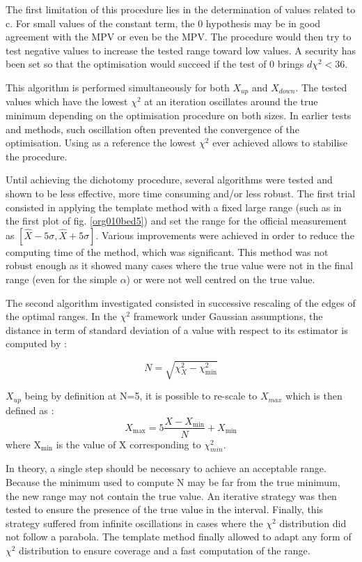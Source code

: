 The first limitation of this procedure lies in the determination of values related to c.
For small values of the constant term, the 0 hypothesis may be in good agreement with the MPV or even be the MPV.
The procedure would then try to test negative values to increase the tested range toward low values.
A security has been set so that the optimisation would succeed if the test of 0 brings $d\chi^2<36$.

This algorithm is performed simultaneously for both $X_{up}$ and $X_{down}$.
The tested values which have the lowest $\chi^2$ at an iteration oscillates around the true minimum depending on the optimisation procedure on both sizes.
In earlier tests and methods, such oscillation often prevented the convergence of the optimisation.
Using as a reference the lowest $\chi^2$ ever achieved allows to stabilise the procedure.

Until achieving the dichotomy procedure, several algorithms were tested and shown to be less effective, more time consuming and/or less robust.
The first trial consisted in applying the template method with a fixed large range (such as in the first plot of fig. \ref{org010bed5}) and set the range for the official measurement as \([\hat{X}- 5\sigma, \hat{X}+ 5\sigma]\).
Various improvements were achieved in order to reduce the computing time of the method, which was significant.
This method was not robust enough as it showed many cases where the true value were not in the final range (even for the simple \(\alpha\)) or were not well centred on the true value.

The second algorithm investigated consisted in successive rescaling of the edges of the optimal ranges.
In the $\chi^2$ framework under Gaussian assumptions, the distance in term of standard deviation of a value with respect to its estimator is computed by :

\begin{equation}
N = \sqrt{\chi^2_{X}-\chi^2_\text{min}}
\end{equation}

$X_{up}$ being by definition at N=5, it is possible to re-scale to $X_{max}$ which is then defined as :
\begin{equation}
X_\text{max} = 5\frac{X-X_\text{min}}{N} + X_\text{min}
\end{equation}
where X\(_{\text{min}}\) is the value of X corresponding to $\chi^2_{min}$.

In theory, a single step should be necessary to achieve an acceptable range.
Because the minimum used to compute N may be far from the true minimum, the new range may not contain the true value.
An iterative strategy was then tested to ensure the presence of the true value in the interval.
Finally, this strategy suffered from infinite oscillations in cases where the $\chi^2$ distribution did not follow a parabola.
The template method finally allowed to adapt any form of $\chi^2$ distribution to ensure coverage and a fast computation of the range.


